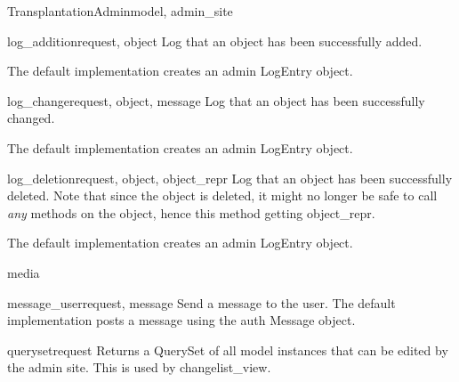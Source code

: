 \documentclass[letterpaper,10pt,english]{sphinxmanual}
\begin{document}
\begin{classdesc}{TransplantationAdmin}{model, admin\_site}
\hypertarget{data.admin.TransplantationAdmin.log_addition}{}\begin{methoddesc}{log\_addition}{request, object}
Log that an object has been successfully added.

The default implementation creates an admin LogEntry object.
\end{methoddesc}

\hypertarget{data.admin.TransplantationAdmin.log_change}{}\begin{methoddesc}{log\_change}{request, object, message}
Log that an object has been successfully changed.

The default implementation creates an admin LogEntry object.
\end{methoddesc}

\hypertarget{data.admin.TransplantationAdmin.log_deletion}{}\begin{methoddesc}{log\_deletion}{request, object, object\_repr}
Log that an object has been successfully deleted. Note that since the
object is deleted, it might no longer be safe to call \emph{any} methods
on the object, hence this method getting object\_repr.

The default implementation creates an admin LogEntry object.
\end{methoddesc}

\hypertarget{data.admin.TransplantationAdmin.media}{}\begin{memberdesc}{media}\end{memberdesc}

\hypertarget{data.admin.TransplantationAdmin.message_user}{}\begin{methoddesc}{message\_user}{request, message}
Send a message to the user. The default implementation
posts a message using the auth Message object.
\end{methoddesc}

\hypertarget{data.admin.TransplantationAdmin.queryset}{}\begin{methoddesc}{queryset}{request}
Returns a QuerySet of all model instances that can be edited by the
admin site. This is used by changelist\_view.
\end{methoddesc}


\end{classdesc}
\end{document}
